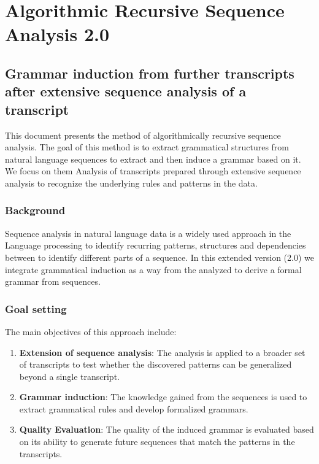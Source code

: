 \documentclass[
]{article}
\author{}
\date{}
\begin{document}
\section{Algorithmic Recursive Sequence Analysis
2.0}\label{algorithmic-recursive-sequence-analysis-2.0}

\subsection{Grammar induction from further transcripts after extensive
sequence analysis of a
transcript}\label{grammar-induction-from-further-transcripts-after-extensive-sequence-analysis-of-a-transcript}

This document presents the method of algorithmically recursive sequence
analysis. The goal of this method is to extract grammatical structures
from natural language sequences to extract and then induce a grammar
based on it. We focus on them Analysis of transcripts prepared through
extensive sequence analysis to recognize the underlying rules and
patterns in the data.

\subsubsection{Background}\label{background}

Sequence analysis in natural language data is a widely used approach in
the Language processing to identify recurring patterns, structures and
dependencies between to identify different parts of a sequence. In this
extended version (2.0) we integrate grammatical induction as a way from
the analyzed to derive a formal grammar from sequences.

\subsubsection{Goal setting}\label{goal-setting}

The main objectives of this approach include:

\begin{enumerate}
\def\labelenumi{\arabic{enumi}.}
\item
  \textbf{Extension of sequence analysis}: The analysis is applied to a
  broader set of transcripts to test whether the discovered patterns can
  be generalized beyond a single transcript.
\item
  \textbf{Grammar induction}: The knowledge gained from the sequences is
  used to extract grammatical rules and develop formalized grammars.
\item
  \textbf{Quality Evaluation}: The quality of the induced grammar is
  evaluated based on its ability to generate future sequences that match
  the patterns in the transcripts.
\end{enumerate}
\end{document}
